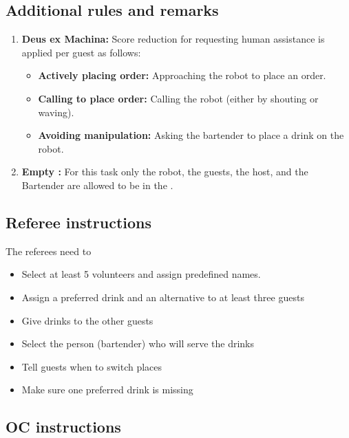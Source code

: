 \subsection*{Additional rules and remarks}
\begin{enumerate}

	\item \textbf{Deus ex Machina:} Score reduction for requesting human assistance is applied per guest as follows:
	\begin{itemize}[nosep]
		\item \textbf{Actively placing order:} Approaching the robot to place an order.

		\item \textbf{Calling to place order:} Calling the robot (either by shouting or waving).

		\item \textbf{Avoiding manipulation:} Asking the bartender to place a drink on the robot.
		
	\end{itemize}

	\item \textbf{Empty \Arena{}:} For this task only the robot, the guests, the host, and the Bartender are allowed to be in the \Arena{}.
\end{enumerate}

\subsection*{Referee instructions}

The referees need to
\begin{itemize}
	\item Select at least 5 volunteers and assign predefined names.
	\item Assign a preferred drink and an alternative to at least three guests
	\item Give drinks to the other guests
	\item Select the person (bartender) who will serve the drinks
	\item Tell guests when to switch places
	\item Make sure one preferred drink is missing
\end{itemize}

\subsection*{OC instructions}

